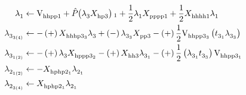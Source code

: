 \documentclass[thesis.tex]{subfiles}
\begin{document}
\begin{align}
  \lambda^{}_{1} &\leftarrow \text{V}^{}_{\text{hhpp}1} + \mathop{\hat{P}\hspace{-2pt}\left( \lambda^{}_{3}X^{}_{\hspace{0.3pt} \text{hp}3}\right) }{}_{1} + \frac{1}{2}\lambda^{}_{1}X^{}_{\hspace{0.3pt} \text{pppp}1} + \frac{1}{2}X^{}_{\hspace{0.3pt} \text{hhhh}1}\lambda^{}_{1} \notag \\
  \lambda^{}_{3_{3\left(4\right)}} &\leftarrow -\left(+\right)X^{}_{\hspace{0.3pt} \text{hhhp}3_{3}}\lambda^{}_{3} +\left(-\right)\lambda^{}_{3_{3}}X^{}_{\hspace{0.3pt} \text{pp}3} -\left(+\right)\frac{1}{2}\text{V}^{}_{\text{hhpp}3_{3}}\left(t^{}_{3_{1}}\lambda^{}_{3_{3}}\right) \notag \\
  \lambda^{}_{3_{1\left(2\right)}} &\leftarrow -\left(+\right)\lambda^{}_{3}X^{}_{\hspace{0.3pt} \text{hppp}3_{2}} -\left(+\right)X^{}_{\hspace{0.3pt} \text{hh}3}\lambda^{}_{3_{1}} -\left(+\right)\frac{1}{2}\left(\lambda^{}_{3_{1}}t^{}_{3_{3}}\right)\text{V}^{}_{\text{hhpp}3_{1}} \notag \\
  \lambda^{}_{2_{1\left(2\right)}} &\leftarrow -X^{}_{\hspace{0.3pt} \text{hphp}2_{1}}\lambda^{}_{2_{1}} \notag \\
  \lambda^{}_{2_{3\left(4\right)}} &\leftarrow X^{}_{\hspace{0.3pt} \text{hphp}2_{1}}\lambda^{}_{2_{1}} \notag
\end{align}
\end{document}
